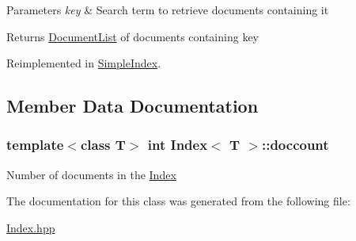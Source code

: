 \begin{DoxyParams}{Parameters}
{\em key} & Search term to retrieve documents containing it \\
\hline
\end{DoxyParams}
\begin{DoxyReturn}{Returns}
\hyperlink{class_document_list}{Document\-List} of documents containing {\ttfamily key} 
\end{DoxyReturn}


Reimplemented in \hyperlink{class_simple_index_a7e05f794bbfadad54b0207b2c3ad1de1}{Simple\-Index}.



\subsection{Member Data Documentation}
\hypertarget{class_index_a40fd362b0f1e15ca09cf6c5234f202a2}{
\subsubsection[{doccount}]{\setlength{\rightskip}{0pt plus 5cm}template$<$class T$>$ int {\bf Index}$<$ T $>$\-::doccount\hspace{0.3cm}{\ttfamily [protected]}}}\label{class_index_a40fd362b0f1e15ca09cf6c5234f202a2}
Number of documents in the \hyperlink{class_index}{Index} 

The documentation for this class was generated from the following file\-:\begin{DoxyCompactItemize}
\item 
\hyperlink{_index_8hpp}{Index.\-hpp}\end{DoxyCompactItemize}
